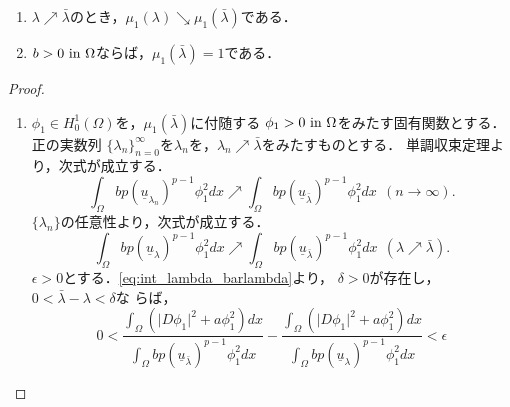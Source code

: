 \begin{lem} \label{lem:mu_1_bar_lambda}
 \begin{enumerate}[1.] \sage
  \item $\lambda \nearrow \bar{\lambda}$のとき，$\mu_1(\lambda)
        \searrow \mu_1(\bar{\lambda})$である．
  \item $b > 0 ~\text{in}~ \Omega$ならば，$\mu_1(\bar{\lambda}) = 1$である．
 \end{enumerate}
\end{lem}
\begin{proof}
 \begin{enumerate}[1.] \sage
  \item $\phi_1 \in H_0^1(\Omega)$を，$\mu_1(\bar{\lambda})$に付随する
        $\phi_1 > 0 ~\text{in}~ \Omega$をみたす固有関数とする．
        正の実数列
        $\{\lambda_n \}_{n=0}^\infty$を$\lambda_n$を，$\lambda_n
        \nearrow \bar{\lambda}$をみたすものとする．
        単調収束定理より，次式が成立する．
        \[
         \int_\Omega bp ( \underline{u}_{\lambda_n} )^{p-1} \phi_1^2
          dx \nearrow \int_\Omega bp
          (\underline{u}_{\bar{\lambda}})^{p-1} \phi_1^2 dx  \ \ (n
        \to \infty).        
        \]
        $\{\lambda_n \}$の任意性より，次式が成立する．
        \begin{equation}
         \int_\Omega bp ( \underline{u}_{\lambda} )^{p-1} \phi_1^2
          dx \nearrow \int_\Omega bp
          (\underline{u}_{\bar{\lambda}})^{p-1} \phi_1^2 dx
           \ \ (\lambda \nearrow \bar{\lambda}).
          \label{eq:int_lambda_barlambda}
        \end{equation}
        $\epsilon > 0$とする．\eqref{eq:int_lambda_barlambda}より，
        $\delta > 0$が存在し，$0 < \bar{\lambda} - \lambda < \delta$な
        らば，
        \begin{equation}
         0 < \frac{\displaystyle \int_\Omega \left( \lvert D\phi_1
                                              \rvert^2
                                              + a
                                             \phi_1^2\right) dx}
         {\displaystyle 
         \int_\Omega bp (\underline{u}_{\bar{\lambda}})^{p-1} \phi_1^2 dx}
         -
         \frac{\displaystyle \int_\Omega \left( \lvert D\phi_1
                                              \rvert^2
                                              + a
                                             \phi_1^2\right) dx}
         {\displaystyle 
         \int_\Omega bp (\underline{u}_{\lambda})^{p-1} \phi_1^2
         dx} < \epsilon \label{eq:zero_int_epsilon}
        \end{equation}

\end{enumerate}
\end{proof}
